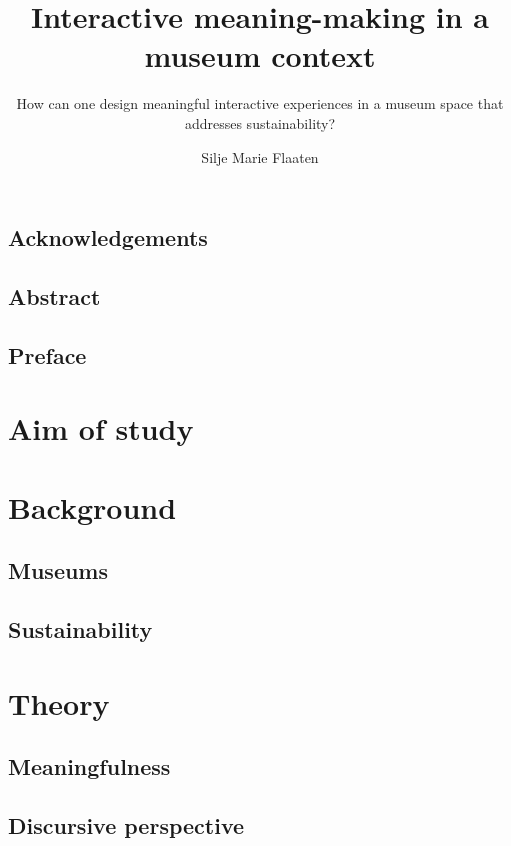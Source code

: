 \documentclass[UKenglish]{ifimaster}
\title{Interactive meaning-making in a museum context}
\subtitle{How can one design meaningful interactive experiences in a museum space that addresses sustainability?}
\author{Silje Marie Flaaten}
\begin{document}
\duoforside[dept={Department of Informatics}, program={Informatics: design, use, interaction},long]



\frontmatter{}
\chapter*{Acknowledgements}


\chapter*{Abstract}


\tableofcontents{}

\chapter*{Preface}


\mainmatter{}
\part{Aim of study}



\part{Background}
\chapter{Museums}

\chapter{Sustainability}


\part{Theory}
\chapter{Meaningfulness}

\chapter{Discursive perspective}

\end{document}
